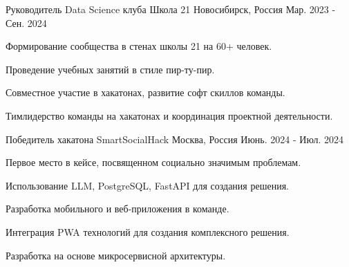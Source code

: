 \begin{cventries}

  \cventry
    {Руководитель Data Science клуба} %
    {Школа 21} %
    {Новосибирск, Россия} %
    {Мар. 2023 - Сен. 2024} %
    {
      \begin{cvitems} %
        \item {Формирование сообщества в стенах школы 21 на 60+ человек.}
        \item {Проведение учебных занятий в стиле пир-ту-пир.}
        \item {Совместное участие в хакатонах, развитие софт скиллов команды.}
        \item {Тимлидерство команды на хакатонах и координация проектной деятельности.}
      \end{cvitems}
    }

  \cventry
    {Победитель хакатона} %
    {SmartSocialHack} %
    {Москва, Россия} %
    {Июнь. 2024 - Июл. 2024} %
    {
      \begin{cvitems} %
        \item {Первое место в кейсе, посвященном социально значимым проблемам.}
        \item {Использование LLM, PostgreSQL, FastAPI для создания решения.}
        \item {Разработка мобильного и веб-приложения в команде.}
        \item {Интеграция PWA технологий для создания комплексного решения.}
        \item {Разработка на основе микросервисной архитектуры.}
      \end{cvitems}
    }

\end{cventries}
